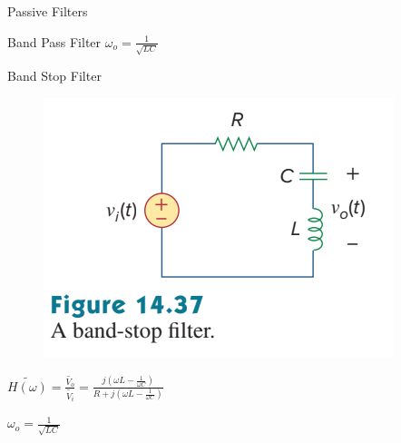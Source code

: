 \documentclass[11pt]{article}
\begin{document}
\begin{section}{Passive Filters}
\begin{subsection}{Band Pass Filter}
$\omega_o = \frac{1}{\sqrt{LC}}$

\end{subsection}

\begin{subsection}{Band Stop Filter}

\begin{figure}
\includegraphics[bb=0 0 30 30]{BSF_RLC.png}
\end{figure}

$\tilde{H(\omega)} = \frac{\tilde{V_o}}{\tilde{V_i}} = \frac{ j(\omega L - \frac{1}{\omega C}) }{R+ j (\omega L - \frac{1}{\omega C})} $

$\omega_o = \frac{1}{\sqrt{LC}}$

\end{subsection}



\end{section}
 
\end{document}
